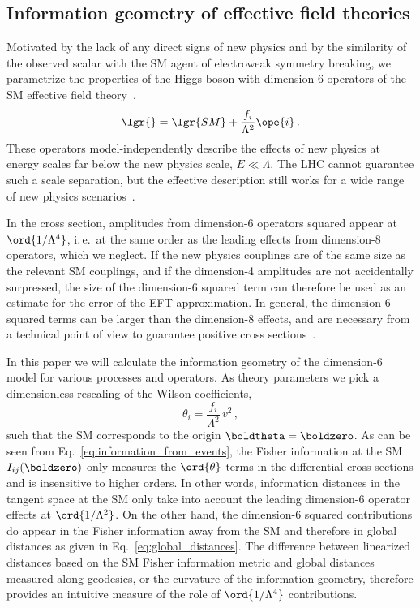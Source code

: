 \subsection*{Information geometry of effective field theories}
\label{sec:information_formalism_eft}

Motivated by the lack of any direct signs of new physics and by the
similarity of the observed scalar with the SM agent of electroweak
symmetry breaking, we parametrize the properties of the Higgs boson
with dimension-6 operators of the SM effective field
theory~\cite{eftfoundations,eftorig,eftreviews},
% 
\begin{equation}
  \lgr{} = \lgr{SM} + \frac {f_i} {\Lambda^2} \ope{i} \,.
\end{equation}
%
These operators model-independently describe the effects of new
physics at energy scales far below the new physics scale,
$E \ll \Lambda$. The LHC cannot guarantee such a scale separation, but
the effective description still works for a wide range of new physics
scenarios~\cite{eft-limits}.

In the cross section, amplitudes from dimension-6 operators squared
appear at $\ord{1/\Lambda^4}$, i.\,e.\ at the same order as the
leading effects from dimension-8 operators, which we neglect. If the
new physics couplings are of the same size as the relevant SM
couplings, and if the dimension-4 amplitudes are not accidentally
surpressed, the size of the dimension-6 squared term can therefore be
used as an estimate for the error of the EFT approximation. In
general, the dimension-6 squared terms can be larger than the
dimension-8 effects, and are necessary from a technical point of view
to guarantee positive cross sections~\cite{eft-edge}.

In this paper we will calculate the information geometry of the
dimension-6 model for various processes and operators. As theory
parameters we pick a dimensionless rescaling of the Wilson
coefficients,
%
\begin{equation}
  \theta_i = \frac {f_i} {\Lambda^2} \, v^2  \,,
\end{equation}
%
such that the SM corresponds to the origin $\boldtheta = \boldzero$.
As can be seen from Eq.~\eqref{eq:information_from_events}, the
Fisher information at the SM $I_{ij} (\boldzero)$ only measures the
$\ord{\theta}$ terms in the differential cross sections and is
insensitive to higher orders. In other words, information distances in
the tangent space at the SM only take into account the leading
dimension-6 operator effects at $\ord{1/\Lambda^2}$. On the other
hand, the dimension-6 squared contributions do appear in the Fisher
information away from the SM and therefore in global distances as
given in Eq.~\eqref{eq:global_distances}. The difference between
linearized distances based on the SM Fisher information metric and
global distances measured along geodesics, or the curvature of the
information geometry, therefore provides an intuitive measure of the
role of $\ord{1/\Lambda^4}$ contributions.

